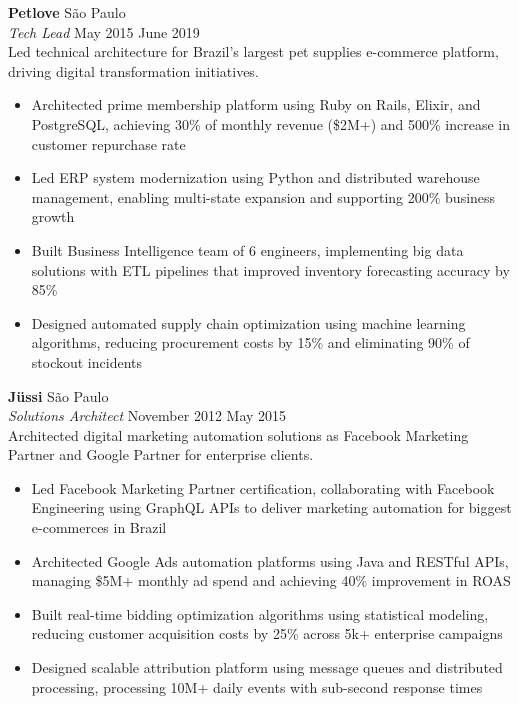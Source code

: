 \documentclass[a4paper]{article}
\begin{document}
\textbf{Petlove}                               \hfill São Paulo             \\
\textit{Tech Lead}                             \hfill May 2015 \raisebox{0.2ex}{\scalebox{0.8}{$\sim$}} June 2019   \\
\vspace{0.5mm}
Led technical architecture for Brazil's largest pet supplies e-commerce platform, driving digital transformation initiatives.
\vspace{-2mm}
\begin{itemize}
\setlength\itemsep{-1mm}
\item Architected prime membership platform using Ruby on Rails, Elixir, and PostgreSQL, achieving 30\% of monthly revenue (\$2M+) and 500\% increase in customer repurchase rate
\item Led ERP system modernization using Python and distributed warehouse management, enabling multi-state expansion and supporting 200\% business growth
\item Built Business Intelligence team of 6 engineers, implementing big data solutions with ETL pipelines that improved inventory forecasting accuracy by 85\%
\item Designed automated supply chain optimization using machine learning algorithms, reducing procurement costs by 15\% and eliminating 90\% of stockout incidents
\end{itemize}

\textbf{Jüssi}                                 \hfill São Paulo              \\
\textit{Solutions Architect} \hfill November 2012 \raisebox{0.2ex}{\scalebox{0.8}{$\sim$}} May 2015                 \\
\vspace{0.5mm}
Architected digital marketing automation solutions as Facebook Marketing Partner and Google Partner for enterprise clients.
\vspace{-2mm}
\begin{itemize}
\setlength\itemsep{-1mm}
\item Led Facebook Marketing Partner certification, collaborating with Facebook Engineering using GraphQL APIs to deliver marketing automation for biggest e-commerces in Brazil
\item Architected Google Ads automation platforms using Java and RESTful APIs, managing \$5M+ monthly ad spend and achieving 40\% improvement in ROAS
\item Built real-time bidding optimization algorithms using statistical modeling, reducing customer acquisition costs by 25\% across 5k+ enterprise campaigns
\item Designed scalable attribution platform using message queues and distributed processing, processing 10M+ daily events with sub-second response times
\end{itemize}
\end{document}
